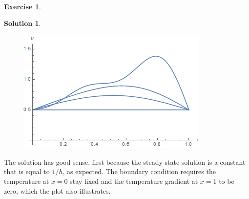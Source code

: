 \documentclass{article}
\theoremstyle{definition}
\newtheorem*{exer*}{Exercise}
\newtheorem*{sln*}{Solution}
\begin{document}
\begin{exer*}
\begin{sln*}
		\begin{figure}[h!]
			\centering
			\includegraphics[scale=0.7]{pset2_2.png}
		\end{figure}
		
		\noindent The solution has good sense, first because the steady-state solution is a constant that is equal to $1/h$, as expected. The boundary condition requires the temperature at $x=0$ stay fixed and the temperature gradient at $x=1$ to be zero, which the plot also illustrates. 
	\end{sln*}
	
\end{exer*}
\newpage
\end{document}
